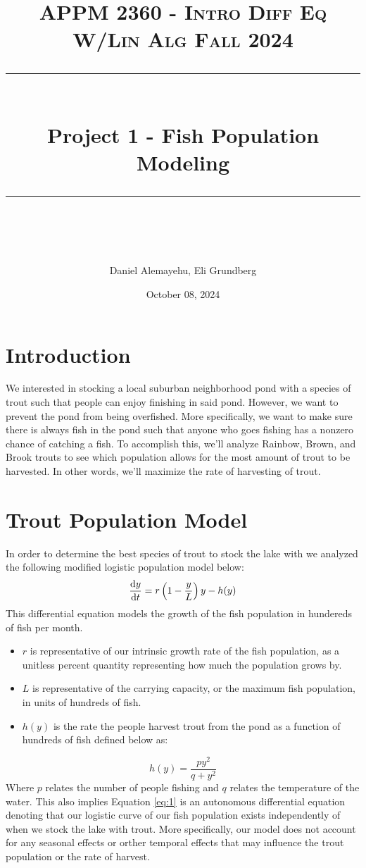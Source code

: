 \documentclass[letterpaper,12pt]{article}
\title{
\normalfont \normalsize 
\textsc{APPM 2360 - Intro Diff Eq W/Lin Alg \hfill Fall 2024} \\
[10pt] 
\rule{\linewidth}{0.5pt} \\[6pt] 
\huge Project 1 - Fish Population Modeling \\
\rule{\linewidth}{2pt}  \\[10pt]
}
\date{October 08, 2024}
\author{Daniel Alemayehu, Eli Grundberg}
\begin{document}
\begin{titlingpage}
\maketitle
\end{titlingpage}

\newpage

\section{Introduction}
We interested in stocking a local suburban neighborhood pond with a species of trout such that people can enjoy finishing in said pond. 
However, we want to prevent the pond from being overfished. 
More specifically, we want to make sure there is always fish in the pond such that anyone who goes fishing has a nonzero chance of catching a fish. 
To accomplish this, we'll analyze Rainbow, Brown, and Brook trouts to see which population allows for the most amount of trout to be harvested. 
In other words, we'll maximize the rate of harvesting of trout.
\section{Trout Population Model}
In order to determine the best species of trout to stock the lake with we analyzed the following modified logistic population model below:
\begin{equation} \label{eq:1}
    \dv{y}{t} = r\left(1 - \frac{y}{L}\right)y - h(y)
\end{equation}
This differential equation models the growth of the fish population in hundereds of fish per month. 
\begin{itemize}
    \item \(r\) is representative of our intrinsic growth rate of the fish population, as a unitless percent quantity representing how much the population grows by.
    \item \(L\) is representative of the carrying capacity, or the maximum fish population, in units of hundreds of fish.
    \item \(h(y)\) is the rate the people harvest trout from the pond as a function of hundreds of fish defined below as:
\end{itemize}
\begin{equation} \label{eq:2}
    h(y) = \frac{py^2}{q + y^2}
\end{equation}
Where \(p\) relates the number of people fishing and \(q\) relates the temperature of the water.
This also implies Equation \eqref{eq:1} is an autonomous differential equation denoting that our logistic curve of our fish population exists independently of when we stock the lake with trout. 
More specifically, our model does not account for any seasonal effects or orther temporal effects that may influence the trout population or the rate of harvest.
\end{document}
